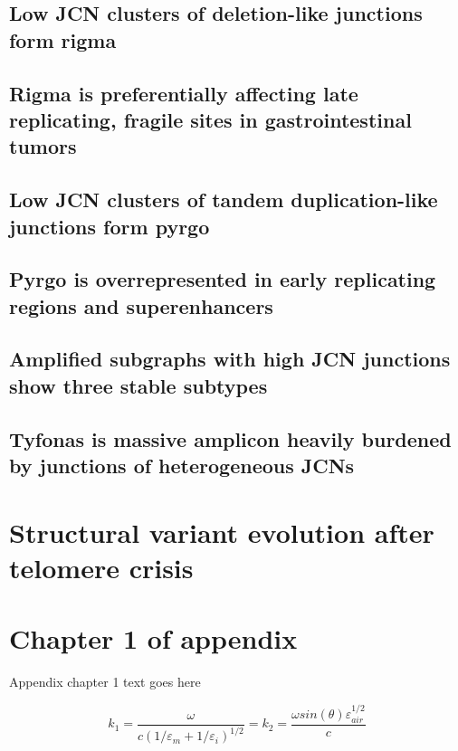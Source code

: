 \documentclass[phd,tocprelim]{cornell}
\begin{document}
\section{Low JCN clusters of deletion-like junctions form rigma}
\section{Rigma is preferentially affecting late replicating, fragile sites in gastrointestinal tumors}
\section{Low JCN clusters of tandem duplication-like junctions form pyrgo}
\section{Pyrgo is overrepresented in early replicating regions and superenhancers}
\section{Amplified subgraphs with high JCN junctions show three stable subtypes}
\section{Tyfonas is massive amplicon heavily burdened by junctions of heterogeneous JCNs}


\chapter{Structural variant evolution after telomere crisis}
\section{}

\appendix
\chapter{Chapter 1 of appendix}
Appendix chapter 1 text goes here

\cite{aiw}

\begin{equation}
    k_1=\frac{\omega }{c({1/\varepsilon_m + 1/\varepsilon_i})^{1/2}}=k_2=\frac{\omega
    sin(\theta)\varepsilon_{air}^{1/2}}{c}
\end{equation}



\end{document}
